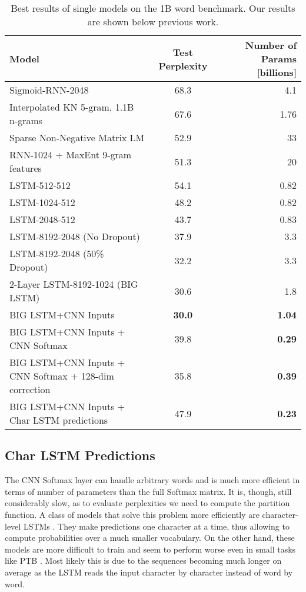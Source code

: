 \documentclass{article}
\begin{document}
\begin{table*}[t!]
\caption{Best results of single models on the 1B word benchmark. Our results are shown below previous work.}
\label{main-results-table}
\vskip 0.15in
\begin{center}
\begin{small}
\begin{sc}
\begin{tabular}{lcr}
\hline
\abovespace\belowspace
Model & Test Perplexity & Number of Params [billions] \\
\hline
\abovespace
Sigmoid-RNN-2048 \cite{Blackout} & 68.3 & 4.1 \\
Interpolated KN 5-gram, 1.1B n-grams \cite{chelba2013one} & 67.6 & 1.76 \\
Sparse Non-Negative Matrix LM \cite{shazeer2015sparse} & 52.9 & 33 \\
RNN-1024 + MaxEnt 9-gram features \cite{chelba2013one} & 51.3 & 20 \\
\hline
\abovespace
LSTM-512-512 & 54.1 & 0.82 \\
LSTM-1024-512 & 48.2 & 0.82 \\
LSTM-2048-512 & 43.7 & 0.83 \\
LSTM-8192-2048 (No Dropout) & 37.9 & 3.3 \\
LSTM-8192-2048 (50\% Dropout) & 32.2 & 3.3 \\
2-Layer LSTM-8192-1024 (BIG LSTM) & 30.6 & 1.8 \\
BIG LSTM+CNN Inputs & \textbf{30.0} & \textbf{1.04} \\
\abovespace
BIG LSTM+CNN Inputs + CNN Softmax & 39.8 & \textbf{0.29} \\
BIG LSTM+CNN Inputs + CNN Softmax + 128-dim correction & 35.8 & \textbf{0.39} \\
BIG LSTM+CNN Inputs + Char LSTM predictions & 47.9 & \textbf{0.23} \\
\hline
\end{tabular}
\end{sc}
\end{small}
\end{center}
\vskip -0.1in
\end{table*}

\subsection{Char LSTM Predictions}
\label{charlstm}

The CNN Softmax layer can handle arbitrary words and is much more efficient in terms of number of parameters than the full Softmax matrix. It is, though, still considerably slow, as to evaluate perplexities we need to compute the partition function. A class of models that solve this problem more efficiently are character-level LSTMs \cite{sutskever2011generating, graves2013generating}. They make predictions one character at a time, thus allowing to compute probabilities over a much smaller vocabulary. On the other hand, these models are more difficult to train and seem to perform worse even in small tasks like PTB \cite{graves2013generating}. Most likely this is due to the sequences becoming much longer on average as the LSTM reads the input character by character instead of word by word.
\end{document}
